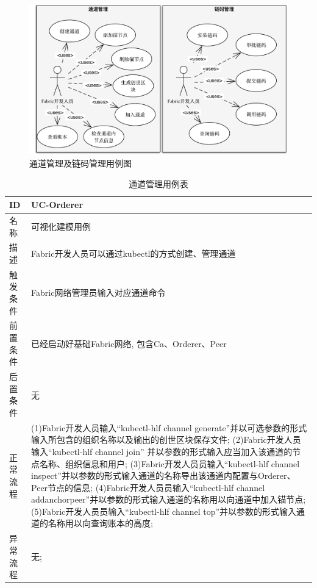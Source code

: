 \begin{figure}[!htbp] %
    \centering %
    \includegraphics[width=1.0\textwidth]{FIGs/chapter4/chan_cc_use_case.pdf} %
    \caption{通道管理及链码管理用例图} %
    \label{chan_cc_use_case} %
\end{figure}%

{\footnotesize
\begin{longtable}[h]{m{60pt}|m{280pt}}
    \caption[通道管理用例表]{通道管理用例表} \label{chan_use_case} \\
        \hline  
        ID&UC-Orderer\\
        \hline
        名称&可视化建模用例\\
        \hline
        描述&Fabric开发人员可以通过kubectl的方式创建、管理通道\\
        \hline
        触发条件&Fabric网络管理员输入对应通道命令\\
        \hline
        前置条件&已经启动好基础Fabric网络, 包含Ca、Orderer、Peer\\
        \hline
        后置条件&无\\
        \hline
        正常流程& (1)Fabric开发人员输入“kubectl-hlf channel generate”并以可选参数的形式输入所包含的组织名称以及输出的创世区块保存文件;
        \newline (2)Fabric开发人员输入“kubectl-hlf channel join” 并以参数的形式输入应当加入该通道的节点名称、组织信息和用户;
        \newline (3)Fabric开发人员员输入“kubectl-hlf channel inspect”并以参数的形式输入通道的名称导出该通道内配置与Orderer、Peer节点的信息;
        \newline (4)Fabric开发人员员输入“kubectl-hlf channel addanchorpeer”并以参数的形式输入通道的名称用以向通道中加入锚节点;
        \newline (5)Fabric开发人员员输入“kubectl-hlf channel top”并以参数的形式输入通道的名称用以向查询账本的高度;\\
        \hline 
        异常流程& 无; \\
        \hline
    \end{longtable} 
}

